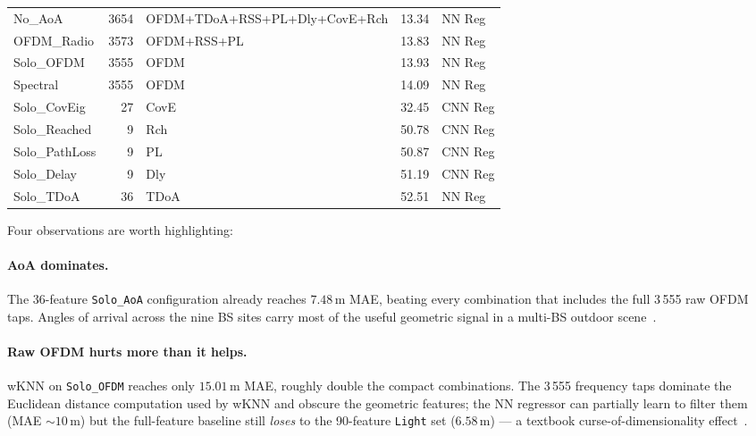 \begin{table}[htbp]
{\begin{tabular}{lrlrl}
No\_AoA              & 3654                 & OFDM+TDoA+RSS+PL+Dly+CovE+Rch & 13.34         & NN Reg \\
OFDM\_Radio          & 3573                 & OFDM+RSS+PL                   & 13.83         & NN Reg \\
Solo\_OFDM           & 3555                 & OFDM                          & 13.93         & NN Reg \\
Spectral             & 3555                 & OFDM                          & 14.09         & NN Reg \\
Solo\_CovEig         & 27                   & CovE                          & 32.45         & CNN Reg \\
Solo\_Reached        & 9                    & Rch                           & 50.78         & CNN Reg \\
Solo\_PathLoss       & 9                    & PL                            & 50.87         & CNN Reg \\
Solo\_Delay          & 9                    & Dly                           & 51.19         & CNN Reg \\
Solo\_TDoA           & 36                   & TDoA                          & 52.51         & NN Reg \\
\bottomrule
\end{tabular}%
}
\end{table}

Four observations are worth highlighting:

\paragraph{AoA dominates.}
The 36-feature \texttt{Solo\_AoA} configuration already reaches
$7.48\,\text{m}$ MAE, beating every combination that includes the full
3\,555 raw OFDM taps.  Angles of arrival across the nine BS sites carry
most of the useful geometric signal in a multi-BS outdoor
scene~\cite{3gpp_nr_channel}.

\paragraph{Raw OFDM hurts more than it helps.}
wKNN on \texttt{Solo\_OFDM} reaches only $15.01\,\text{m}$ MAE, roughly
double the compact combinations.  The 3\,555 frequency taps dominate the
Euclidean distance computation used by wKNN and obscure the geometric
features; the NN regressor can partially learn to filter them
(MAE $\sim 10\,\text{m}$) but the full-feature baseline still
\emph{loses} to the 90-feature \texttt{Light} set
($6.58\,\text{m}$) --- a textbook curse-of-dimensionality
effect~\cite{vandermaaten2008tsne}.


